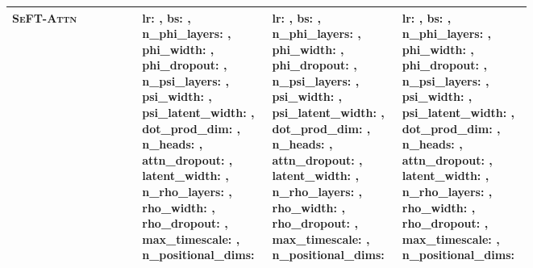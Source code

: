 \documentclass{article}
\newcommand{\methodname}     {\textsc{SeFT}\xspace}
\newcommand{\method}[1]{\textsc{#1}}
\begin{document}
\begin{table*}
\begin{tabularx}{\linewidth}{Xp{0.25\linewidth}p{0.25\linewidth}p{0.25\linewidth}}
\midrule
\method{\methodname-Attn} &
    lr: , bs: , n\_phi\_layers: , phi\_width: , phi\_dropout: , n\_psi\_layers: , psi\_width: , psi\_latent\_width: , dot\_prod\_dim: , n\_heads: , attn\_dropout: , latent\_width: , n\_rho\_layers: , rho\_width: , rho\_dropout: , max\_timescale: , n\_positional\_dims:  &
    lr: , bs: , n\_phi\_layers: , phi\_width: , phi\_dropout: , n\_psi\_layers: , psi\_width: , psi\_latent\_width: , dot\_prod\_dim: , n\_heads: , attn\_dropout: , latent\_width: , n\_rho\_layers: , rho\_width: , rho\_dropout: , max\_timescale: , n\_positional\_dims:  &
    lr: , bs: , n\_phi\_layers: , phi\_width: , phi\_dropout: , n\_psi\_layers: , psi\_width: , psi\_latent\_width: , dot\_prod\_dim: , n\_heads: , attn\_dropout: , latent\_width: , n\_rho\_layers: , rho\_width: , rho\_dropout: , max\_timescale: , n\_positional\_dims:  \\
\bottomrule
\end{tabularx}
\end{table*}
\end{document}
